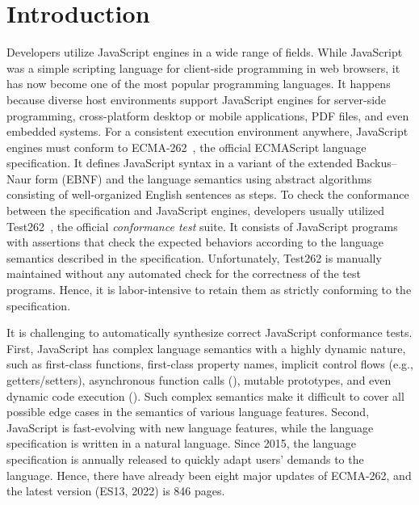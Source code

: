 \section{Introduction}\label{sec:intro}

Developers utilize JavaScript engines in a wide range of fields.
%
While JavaScript was a simple scripting language for client-side programming in
web browsers, it has now become one of the most popular programming languages.
%
It happens because diverse host environments support JavaScript engines for
server-side programming, cross-platform desktop or mobile applications, PDF
files, and even embedded systems.
%
For a consistent execution environment anywhere, JavaScript engines must conform
to ECMA-262~\cite{es13}, the official ECMAScript language specification.
%
It defines JavaScript syntax in a variant of the extended Backus–Naur form
(EBNF) and the language semantics using abstract algorithms consisting of
well-organized English sentences as steps.
%
To check the conformance between the specification and JavaScript engines,
developers usually utilized Test262~\cite{test262}, the official
\textit{conformance test} suite.
%
It consists of JavaScript programs with assertions that check the expected
behaviors according to the language semantics described in the specification.
%
Unfortunately, Test262 is manually maintained without any automated check for
the correctness of the test programs.
%
Hence, it is labor-intensive to retain them as strictly conforming to the
specification.


It is challenging to automatically synthesize correct JavaScript conformance
tests.
%
First, JavaScript has complex language semantics with a highly dynamic nature,
such as first-class functions, first-class property names, implicit control
flows (e.g., getters/setters), asynchronous function calls (),
mutable prototypes, and even dynamic code execution ().
%
Such complex semantics make it difficult to cover all possible edge cases in the
semantics of various language features.
%
Second, JavaScript is fast-evolving with new language features, while the
language specification is written in a natural language.
%
Since 2015, the language specification is annually released to quickly adapt
users' demands to the language.
%
Hence, there have already been eight major updates of ECMA-262, and the latest
version (ES13, 2022) is 846 pages.


